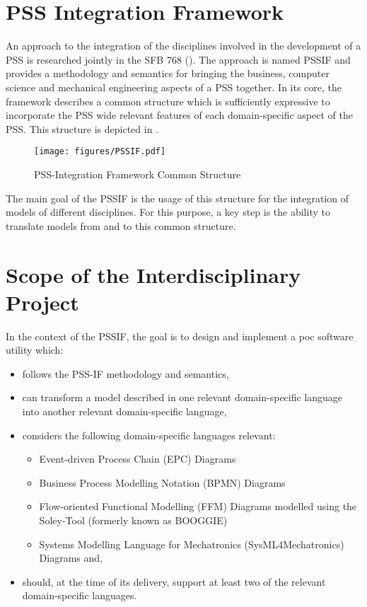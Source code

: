 \section*{PSS Integration Framework}

An approach to the integration of the disciplines involved in the development of a \gls{PSS} is researched jointly in the SFB 768 (\cite{ref:sfb}). The approach is named \gls{PSSIF} \cite{ref:paper} and provides a methodology and semantics for bringing the business, computer science and mechanical engineering aspects of a \gls{PSS} together. In its core, the framework describes a common structure which is sufficiently expressive to incorporate the \gls{PSS} wide relevant features of each domain-specific aspect of the PSS. This structure is depicted in .

\begin{figure}
\centering
\texttt{[image: figures/PSSIF.pdf]}
\caption{PSS-Integration Framework Common Structure}
\label{fig:canonic}
\end{figure}

The main goal of the \gls{PSSIF} is the usage of this structure for the integration of models of different disciplines. For this purpose, a key step is the ability to translate models from and to this common structure.

\section*{Scope of the Interdisciplinary Project}

In the context of the \gls{PSSIF}, the goal is to design and implement a \gls{poc} software utility which:

\begin{itemize}
\item follows the PSS-IF methodology and semantics,
\item can transform a model described in one relevant domain-specific language into another relevant domain-specific language,
\item considers the following domain-specific languages relevant:
	\begin{itemize}
	\item Event-driven Process Chain (EPC) Diagrams \cite{ref:epk}
	\item Business Process Modelling Notation (BPMN) Diagrams \cite{ref:bpmn}
	\item Flow-oriented Functional Modelling (FFM) Diagrams \cite{ref:ufm} modelled using the Soley-Tool (formerly known as BOOGGIE) \cite{ref:soley}
	\item Systems Modelling Language for Mechatronics (SysML4Mechatronics) Diagrams \cite{ref:sysml} and,
	\end{itemize}
\item should, at the time of its delivery, support at least two of the relevant domain-specific languages.
\end{itemize} 

